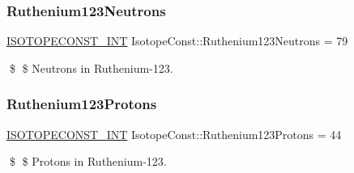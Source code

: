 \subsubsection{\texorpdfstring{Ruthenium123\+Neutrons}{Ruthenium123Neutrons}}
{\footnotesize\ttfamily \mbox{\hyperlink{group___isotope_const-_macros_ga5f18360b3e99483a35c32d789e62621c}{I\+S\+O\+T\+O\+P\+E\+C\+O\+N\+S\+T\+\_\+\+I\+NT}} Isotope\+Const\+::\+Ruthenium123\+Neutrons = 79}

\$ \$ Neutrons in Ruthenium-\/123. \mbox{\label{group___isotope_const-_ruthenium-_ru123_ga447eb5d8f749dfd7ebbdecec0ecae517}} 
\subsubsection{\texorpdfstring{Ruthenium123\+Protons}{Ruthenium123Protons}}
{\footnotesize\ttfamily \mbox{\hyperlink{group___isotope_const-_macros_ga5f18360b3e99483a35c32d789e62621c}{I\+S\+O\+T\+O\+P\+E\+C\+O\+N\+S\+T\+\_\+\+I\+NT}} Isotope\+Const\+::\+Ruthenium123\+Protons = 44}

\$ \$ Protons in Ruthenium-\/123. 